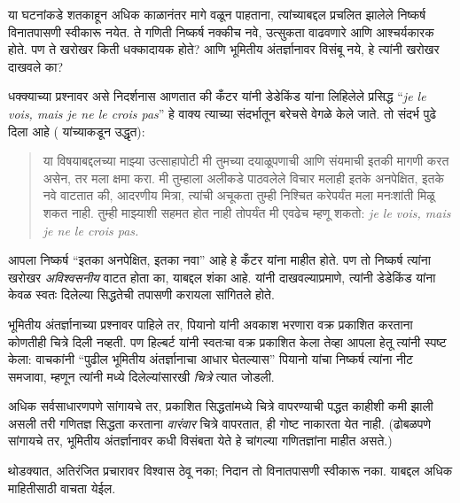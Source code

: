 \documentclass[../../../include/open-logic-section]{subfiles}
\begin{document}


या घटनांकडे शतकाहून अधिक काळानंतर मागे वळून पाहताना, त्यांच्याबद्दल प्रचलित झालेले निष्कर्ष विनातपासणी स्वीकारू नयेत. ते गणिती निष्कर्ष नक्कीच नवे, उत्सुकता वाढवणारे आणि आश्चर्यकारक होते. पण ते खरोखर किती धक्कादायक होते? आणि भूमितीय अंतर्ज्ञानावर विसंबू नये, हे त्यांनी खरोखर दाखवले का?

धक्क्याच्या प्रश्नावर \citet{Gouvea2011} असे निदर्शनास आणतात की कँटर यांनी डेडेकिंड यांना लिहिलेले प्रसिद्ध “\emph{je le vois, mais je ne le crois
pas}” हे वाक्य त्याच्या संदर्भातून बरेचसे वेगळे केले जाते. तो संदर्भ पुढे दिला आहे (\citeauthor{Gouvea2011} यांच्याकडून उद्धृत):
\begin{quote}
या विषयाबद्दलच्या माझ्या उत्साहापोटी मी तुमच्या दयाळूपणाची आणि संयमाची इतकी मागणी करत असेन, तर मला क्षमा करा. मी तुम्हाला अलीकडे पाठवलेले विचार मलाही इतके अनपेक्षित, इतके नवे वाटतात की, आदरणीय मित्रा, त्यांची अचूकता तुम्ही निश्चित करेपर्यंत मला मनःशांती मिळू शकत नाही. तुम्ही माझ्याशी सहमत होत नाही तोपर्यंत मी एवढेच म्हणू शकतो:
\emph{je le vois, mais je ne le crois pas.}
\end{quote}
आपला निष्कर्ष “इतका अनपेक्षित, इतका नवा” आहे हे कँटर यांना माहीत होते. पण तो निष्कर्ष त्यांना खरोखर \emph{अविश्वसनीय} वाटत होता का, याबद्दल शंका आहे. \citeauthor{Gouvea2011} यांनी दाखवल्याप्रमाणे, त्यांनी डेडेकिंड यांना केवळ स्वतः दिलेल्या सिद्धतेची तपासणी करायला सांगितले होते.

भूमितीय अंतर्ज्ञानाच्या प्रश्नावर पाहिले तर, पियानो यांनी अवकाश भरणारा वक्र प्रकाशित करताना कोणतीही चित्रे दिली नव्हती. पण हिल्बर्ट यांनी स्वतःचा वक्र प्रकाशित केला तेव्हा आपला हेतू त्यांनी स्पष्ट केला: वाचकांनी “पुढील भूमितीय अंतर्ज्ञानाचा आधार घेतल्यास” पियानो यांचा निष्कर्ष त्यांना नीट समजावा, म्हणून त्यांनी  मध्ये दिलेल्यांसारखी \emph{चित्रे} त्यात जोडली.

अधिक सर्वसाधारणपणे सांगायचे तर, प्रकाशित सिद्धतांमध्ये चित्रे वापरण्याची पद्धत काहीशी कमी झाली असली तरी गणितज्ञ सिद्धता करताना \emph{वारंवार} चित्रे वापरतात, ही गोष्ट नाकारता येत नाही. (ढोबळपणे सांगायचे तर, भूमितीय अंतर्ज्ञानावर कधी विसंबता येते हे चांगल्या गणितज्ञांना माहीत असते.)

थोडक्यात, अतिरंजित प्रचारावर विश्वास ठेवू नका; निदान तो विनातपासणी स्वीकारू नका. याबद्दल अधिक माहितीसाठी \citet{Giaquinto2007} वाचता येईल.
\end{document}
